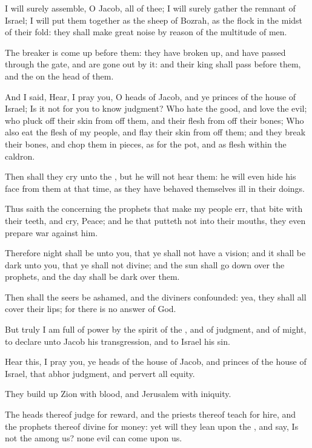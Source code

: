 \Verse I will surely assemble, O Jacob, all of thee; I will surely gather the remnant of Israel; I will put them together as the sheep of Bozrah, as the flock in the midst of their fold: they shall make great noise by reason of the multitude of men.

\Verse The breaker is come up before them: they have broken up, and have passed through the gate, and are gone out by it: and their king shall pass before them, and the \LORD on the head of them.


\Chapter
\Verse And I said, Hear, I pray you, O heads of Jacob, and ye princes of the house of Israel; Is it not for you to know judgment?  \Verse Who hate the good, and love the evil; who pluck off their skin from off them, and their flesh from off their bones; \Verse Who also eat the flesh of my people, and flay their skin from off them; and they break their bones, and chop them in pieces, as for the pot, and as flesh within the caldron.

\Verse Then shall they cry unto the \LORD, but he will not hear them: he will even hide his face from them at that time, as they have behaved themselves ill in their doings.

\Verse Thus saith the \LORD concerning the prophets that make my people err, that bite with their teeth, and cry, Peace; and he that putteth not into their mouths, they even prepare war against him.

\Verse Therefore night shall be unto you, that ye shall not have a vision; and it shall be dark unto you, that ye shall not divine; and the sun shall go down over the prophets, and the day shall be dark over them.

\Verse Then shall the seers be ashamed, and the diviners confounded: yea, they shall all cover their lips; for there is no answer of God.

\Verse But truly I am full of power by the spirit of the \LORD, and of judgment, and of might, to declare unto Jacob his transgression, and to Israel his sin.

\Verse Hear this, I pray you, ye heads of the house of Jacob, and princes of the house of Israel, that abhor judgment, and pervert all equity.

\Verse They build up Zion with blood, and Jerusalem with iniquity.

\Verse The heads thereof judge for reward, and the priests thereof teach for hire, and the prophets thereof divine for money: yet will they lean upon the \LORD, and say, Is not the \LORD among us? none evil can come upon us.

